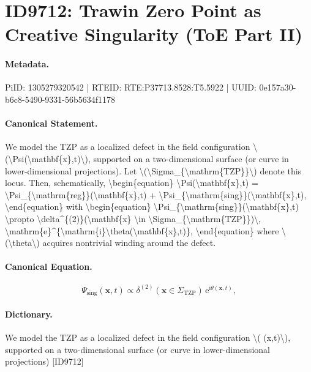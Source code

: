 \section*{ID9712: Trawin Zero Point as Creative Singularity (ToE Part II)}
\paragraph{Metadata.}
PiID: 1305279320542 | RTEID: RTE:P37713.8528:T5.5922 | UUID: 0e157a30-b6c8-5490-9331-56b5634f1178

\paragraph{Canonical Statement.}
We model the TZP as a localized defect in the field configuration \textbackslash{}(\textbackslash{}Psi(\textbackslash{}mathbf\{x\},t)\textbackslash{}), supported on a two-dimensional surface (or curve in lower-dimensional projections). Let \textbackslash{}(\textbackslash{}Sigma\_\{\textbackslash{}mathrm\{TZP\}\}\textbackslash{}) denote this locus. Then, schematically, \textbackslash{}begin\{equation\} \textbackslash{}Psi(\textbackslash{}mathbf\{x\},t) = \textbackslash{}Psi\_\{\textbackslash{}mathrm\{reg\}\}(\textbackslash{}mathbf\{x\},t) + \textbackslash{}Psi\_\{\textbackslash{}mathrm\{sing\}\}(\textbackslash{}mathbf\{x\},t), \textbackslash{}end\{equation\} with \textbackslash{}begin\{equation\} \textbackslash{}Psi\_\{\textbackslash{}mathrm\{sing\}\}(\textbackslash{}mathbf\{x\},t) \textbackslash{}propto \textbackslash{}delta\textasciicircum{}\{(2)\}(\textbackslash{}mathbf\{x\} \textbackslash{}in \textbackslash{}Sigma\_\{\textbackslash{}mathrm\{TZP\}\})\textbackslash{}, \textbackslash{}mathrm\{e\}\textasciicircum{}\{\textbackslash{}mathrm\{i\}\textbackslash{}theta(\textbackslash{}mathbf\{x\},t)\}, \textbackslash{}end\{equation\} where \textbackslash{}(\textbackslash{}theta\textbackslash{}) acquires nontrivial winding around the defect.

\paragraph{Canonical Equation.}
\[
\Psi_{\mathrm{sing}}(\mathbf{x},t) \propto \delta^{(2)}(\mathbf{x} \in \Sigma_{\mathrm{TZP}})\, \mathrm{e}^{\mathrm{i}\theta(\mathbf{x},t)},
\]

\paragraph{Dictionary.}
We model the TZP as a localized defect in the field configuration \textbackslash{}( (x,t)\textbackslash{}), supported on a two-dimensional surface (or curve in lower-dimensional projections) [ID9712]

